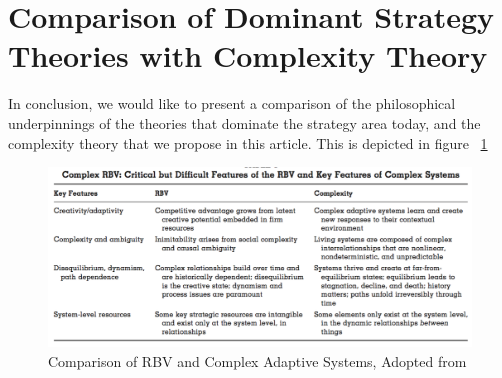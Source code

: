 \documentclass[12pt]{article}
\begin{document}
\section{Comparison of Dominant Strategy Theories with Complexity Theory}
In conclusion, we would like to present a comparison of the philosophical underpinnings of the theories that dominate the strategy area today, and the complexity theory that we propose in this article. This is depicted in figure ~\ref{fig:rbvcad}
\begin{figure}[h]
\centering
\includegraphics[width=16cm]{RBVandCADColbert2004}
\caption{Comparison of RBV and Complex Adaptive Systems, Adopted from \cite{Colbert2004}}
\label{fig:rbvcad}
\end{figure}
\end{document}
